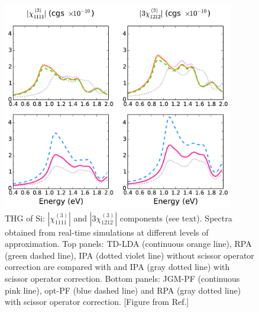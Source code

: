 \begin{figure}[ht]
\centering
\includegraphics[width=0.9\textwidth]{Figures/X3.pdf}
\caption{\footnotesize{THG of Si: $|\chi^{(3)}_{1111}|$ and $|3\chi^{(3)}_{1212}|$ components (see text). Spectra obtained from real-time simulations at different levels of approximation. Top panels: TD-LDA (continuous orange line), RPA (green dashed line), IPA (dotted violet line) without scissor operator correction are compared with and IPA (gray dotted line) with scissor operator correction. Bottom panels: JGM-PF (continuous pink line), opt-PF (blue dashed line) and RPA (gray dotted line) with scissor operator correction. [Figure from Ref.\cite{gruningtddf1}] }} \label{fg:siX3ab}
\end{figure}
